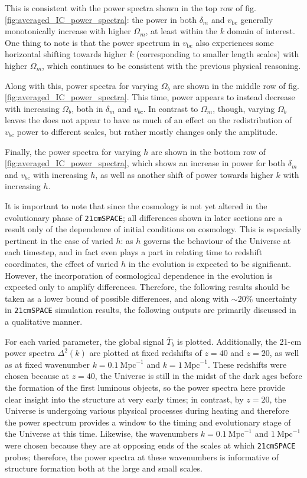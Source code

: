 \documentclass[floats,floatfix,showpacs,amssymb,prd,superscriptaddress,nofootinbib]{revtex4-2} %
\newcommand{\code}{\texttt}
\begin{document}
This is consistent with the power spectra shown in the top row of fig. \ref{fig:averaged_IC_power_spectra}: the power in both $\delta_m$ and $v_{\text{bc}}$ generally monotonically increase with higher $\Omega_m$, at least within the $k$ domain of interest. One thing to note is that the power spectrum in $v_{\text{bc}}$ also experiences some horizontal shifting towards higher $k$ (corresponding to smaller length scales) with higher $\Omega_m$, which continues to be consistent with the previous physical reasoning.

Along with this, power spectra for varying $\Omega_b$ are shown in the middle row of fig. \ref{fig:averaged_IC_power_spectra}. This time, power appears to instead decrease with increasing $\Omega_b$, both in $\delta_m$ and $v_{bc}$. In contrast to $\Omega_m$, though, varying $\Omega_b$ leaves the  does not appear to have as much of an effect on the redistribution of $v_{bc}$ power to different scales, but rather mostly changes only the amplitude.

Finally, the power spectra for varying $h$ are shown in the bottom row of \ref{fig:averaged_IC_power_spectra}, which shows an increase in power for both $\delta_m$ and $v_{bc}$ with increasing $h$, as well as another shift of power towards higher $k$ with increasing $h$.

It is important to note that since the cosmology is not yet altered in the evolutionary phase of \code{21cmSPACE}; all differences shown in later sections are a result only of the dependence of initial conditions on cosmology. This is especially pertinent in the case of varied $h$: as $h$ governs the behaviour of the Universe at each timestep, and in fact even plays a part in relating time to redshift coordinates, the effect of varied $h$ in the evolution is expected to be significant. However, the incorporation of cosmological dependence in the evolution is expected only to amplify differences. Therefore, the following results should be taken as a lower bound of possible differences, and along with $\sim 20\%$ uncertainty in \code{21cmSPACE} simulation results, the following outputs are primarily discussed in a qualitative manner.

For each varied parameter, the global signal $\overline{T}_b$ is plotted. Additionally, the 21-cm power spectra $\Delta^2(k)$ are plotted at fixed redshifts of $z = 40$ and $z = 20$, as well as at fixed wavenumber $k = 0.1 ~\text{Mpc}^{-1}$ and $k = 1 ~\text{Mpc}^{-1}$. These redshifts were chosen because at $z = 40$, the Universe is still in the midst of the dark ages before the formation of the first luminous objects, so the power spectra here provide clear insight into the structure at very early times; in contrast, by $z = 20$, the Universe is undergoing various physical processes during heating and therefore the power spectrum provides a window to the timing and evolutionary stage of the Universe at this time. Likewise, the wavenumbers $k = 0.1 ~\text{Mpc}^{-1}$ and $1 ~\text{Mpc}^{-1}$ were chosen because they are at opposing ends of the scales at which \code{21cmSPACE} probes; therefore, the power spectra at these wavenumbers is informative of structure formation both at the large and small scales.
\end{document}
